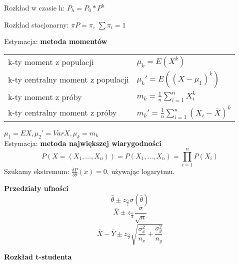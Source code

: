 \documentclass[a4paper]{article}
\begin{document}
    Rozkład w czasie h: $P_h = P_0 * P^h$

    Rozkład stacjonarny: $\pi P = \pi$, $\sum \pi_i = 1$

    Estymacja: \textbf{metoda momentów}

    \begin{table}[H]
        \begin{center}
            \begin{tabular}{ p{} p{}}
                k-ty moment z populacji &
                $\mu_k = E(X^k)$\\

                k-ty centralny moment z populacji &
                $\mu_k' = E((X - \mu_1)^k)$\\

                k-ty moment z próby &
                $m_k = \frac{1}{n} \sum_{i=1}^n X_i^k$\\

                k-ty centralny moment z próby &
                $m_k' = \frac{1}{n} \sum_{i=1}^n (X_i - \bar{X})^k$
            \end{tabular}
        \end{center}
    \end{table}

    $\mu_1 = EX, \mu_2' = VarX, \mu_k = m_k$\\

    Estymacja: \textbf{metoda największej wiarygodności}
    \begin{equation*}
        P(X = (X_1, \dots, X_n)) = P(X_1, \dots, X_n) = \prod_{i=1}^n P(X_i)
    \end{equation*}
    Szukamy ekstremum: $\frac{\delta P}{\delta \theta} (x) = 0$, używając logarytmu.


    \textbf{Przedziały ufności}
    \begin{equation*}
        \hat{\theta} \pm z_{\frac{\alpha}{2}} \sigma(\hat{\theta})
    \end{equation*}
    \begin{equation*}
        \bar{X} \pm z_{\frac{\alpha}{2}} \frac{\sigma}{\sqrt{n}}
    \end{equation*}
    \begin{equation*}
        \bar{X} - \bar{Y} \pm z_{\frac{\alpha}{2}} \sqrt{\frac{\sigma_x^2}{n_x} + \frac{\sigma_y^2}{n_y}}
    \end{equation*}

    \textbf{Rozkład t-studenta}
\end{document}
